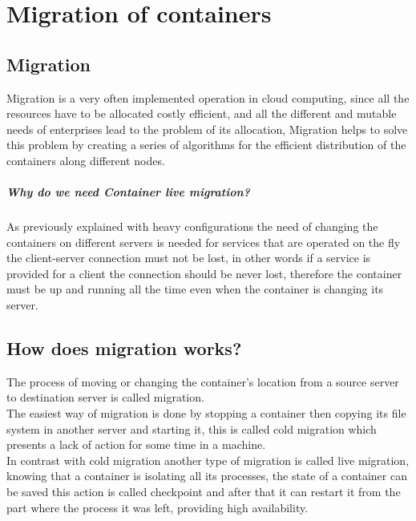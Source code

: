 \chapter{Migration of containers} 

\section{Migration}

Migration is a very often implemented operation in cloud computing, since all the resources have to be allocated costly efficient, and all the different and mutable needs of enterprises lead to the problem of its allocation, Migration helps to solve this problem by creating a series of algorithms for the efficient distribution of the containers along different nodes.\\

\paragraph{Why do we need Container live migration?}

As previously explained with heavy configurations the need of changing the containers on different servers is needed for services that are operated on the fly the client-server connection must not be lost, in other words if a service is provided for a client the connection should be never lost, therefore the container must be up and running all the time even when the container is changing its server.\\


\section{How does migration works?}
The process of moving or changing the container’s location from a source server to destination server is called migration.\\

The easiest way of migration is done by stopping a container then copying its file system in another server and starting it, this is called cold migration which presents a lack of action for some time in a machine. \\

In contrast with cold migration another type of migration is called live migration, knowing that a container is isolating all its processes, the state of a container can be saved this action is called checkpoint and after that it can restart it from the part where the process it was left, providing high availability.\\

